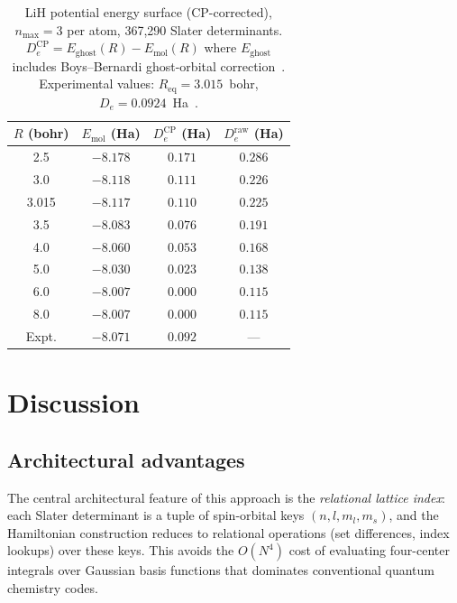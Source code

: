 \documentclass[aps,pra,twocolumn,superscriptaddress,longbibliography,floatfix]{revtex4-2}
\begin{document}
\begin{table}[h]
\caption{\label{tab:lih}%
LiH potential energy surface (CP-corrected), $n_{\max}=3$ per atom,
367{,}290 Slater determinants.
$D_e^{\text{CP}} = E_{\text{ghost}}(R) - E_{\text{mol}}(R)$
where $E_{\text{ghost}}$ includes Boys--Bernardi ghost-orbital
correction~\cite{Boys1970}.
Experimental values: $R_{\text{eq}} = 3.015$~bohr,
$D_e = 0.0924$~Ha~\cite{Huber1979}.}
\begin{ruledtabular}
\begin{tabular}{cccc}
$R$ (bohr) & $E_{\text{mol}}$ (Ha)
           & $D_e^{\text{CP}}$ (Ha)
           & $D_e^{\text{raw}}$ (Ha) \\
\hline
2.5   & $-8.178$ & $0.171$ & $0.286$ \\
3.0   & $-8.118$ & $0.111$ & $0.226$ \\
3.015 & $-8.117$ & $0.110$ & $0.225$ \\
3.5   & $-8.083$ & $0.076$ & $0.191$ \\
4.0   & $-8.060$ & $0.053$ & $0.168$ \\
5.0   & $-8.030$ & $0.023$ & $0.138$ \\
6.0   & $-8.007$ & $0.000$ & $0.115$ \\
8.0   & $-8.007$ & $0.000$ & $0.115$ \\
\hline
Expt. & $-8.071$ & $0.092$ & --- \\
\end{tabular}
\end{ruledtabular}
\end{table}

\section{Discussion}
\label{sec:discussion}

\subsection{Architectural advantages}
\label{sec:advantages}

The central architectural feature of this approach is the
\emph{relational lattice index}: each Slater determinant is a tuple
of spin-orbital keys $(n, l, m_l, m_s)$, and the Hamiltonian
construction reduces to relational operations (set differences,
index lookups) over these keys.
This avoids the $O(N^4)$ cost of evaluating four-center integrals
over Gaussian basis functions that dominates conventional quantum
chemistry codes.
\end{document}
